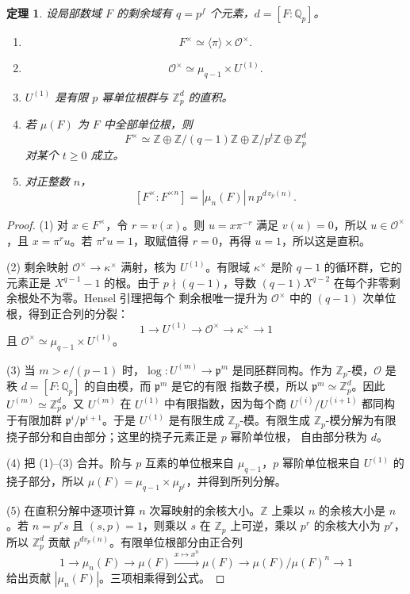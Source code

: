 \documentclass[11pt,a4paper,openany]{ctexbook}
\numberwithin{equation}{chapter}
\newcommand{\Q}{\mathbb{Q}}
\newcommand{\Z}{\mathbb{Z}}
\theoremstyle{plain}
\newtheorem{theorem}{定理}[chapter]
\theoremstyle{definition}
\theoremstyle{remark}
\begin{document}
\begin{theorem}
设局部数域 $F$ 的剩余域有 $q=p^f$ 个元素，$d=[F:\Q_p]$。
\begin{enumerate}[label=(\arabic*)]
\item
\[
F^\times\simeq \langle\pi\rangle\times\mathcal O^\times.
\]
\item
\[
\mathcal O^\times\simeq \mu_{q-1}\times U^{(1)}.
\]
\item $U^{(1)}$ 是有限 $p$ 幂单位根群与 $\Z_p^d$ 的直积。
\item 若 $\mu(F)$ 为 $F$ 中全部单位根，则
\[
F^\times\simeq
\Z\oplus \Z/(q-1)\Z\oplus \Z/p^t\Z\oplus \Z_p^d
\]
对某个 $t\ge0$ 成立。
\item 对正整数 $n$，
\[
[F^\times:F^{\times n}]
=|\mu_n(F)|\, n\, p^{d\,v_p(n)}.
\]
\end{enumerate}
\end{theorem}

\begin{proof}
(1) 对 $x\in F^\times$，令 $r=v(x)$。则 $u=x\pi^{-r}$ 满足 $v(u)=0$，所以
$u\in\mathcal O^\times$，且 $x=\pi^r u$。若 $\pi^r u=1$，取赋值得 $r=0$，再得
$u=1$，所以这是直积。

(2) 剩余映射 $\mathcal O^\times\to\kappa^\times$ 满射，核为 $U^{(1)}$。有限域
$\kappa^\times$ 是阶 $q-1$ 的循环群，它的元素正是 $X^{q-1}-1$ 的根。由于
$p\nmid(q-1)$，导数 $(q-1)X^{q-2}$ 在每个非零剩余根处不为零。Hensel 引理把每个
剩余根唯一提升为 $\mathcal O^\times$ 中的 $(q-1)$ 次单位根，得到正合列的分裂：
\[
1\to U^{(1)}\to\mathcal O^\times\to\kappa^\times\to1
\]
且 $\mathcal O^\times\simeq\mu_{q-1}\times U^{(1)}$。

(3) 当 $m>e/(p-1)$ 时，$\log:U^{(m)}\to\mathfrak p^m$ 是同胚群同构。作为
$\Z_p$-模，$\mathcal O$ 是秩 $d=[F:\Q_p]$ 的自由模，而 $\mathfrak p^m$ 是它的有限
指数子模，所以 $\mathfrak p^m\simeq\Z_p^d$。因此 $U^{(m)}\simeq\Z_p^d$。又
$U^{(m)}$ 在 $U^{(1)}$ 中有限指数，因为每个商 $U^{(i)}/U^{(i+1)}$ 都同构于有限加群
$\mathfrak p^i/\mathfrak p^{i+1}$。于是 $U^{(1)}$ 是有限生成 $\Z_p$-模。有限生成
$\Z_p$-模分解为有限挠子部分和自由部分；这里的挠子元素正是 $p$ 幂阶单位根，
自由部分秩为 $d$。

(4) 把 (1)--(3) 合并。阶与 $p$ 互素的单位根来自 $\mu_{q-1}$，$p$ 幂阶单位根来自
$U^{(1)}$ 的挠子部分，所以
$\mu(F)=\mu_{q-1}\times\mu_{p^t}$，并得到所列分解。

(5) 在直积分解中逐项计算 $n$ 次幂映射的余核大小。$\Z$ 上乘以 $n$ 的余核大小是
$n$。若 $n=p^rs$ 且 $(s,p)=1$，则乘以 $s$ 在 $\Z_p$ 上可逆，乘以 $p^r$ 的余核大小为
$p^r$，所以 $\Z_p^d$ 贡献 $p^{d v_p(n)}$。有限单位根部分由正合列
\[
1\to\mu_n(F)\to\mu(F)\xrightarrow{x\mapsto x^n}\mu(F)\to\mu(F)/\mu(F)^n\to1
\]
给出贡献 $|\mu_n(F)|$。三项相乘得到公式。
\end{proof}
\end{document}
